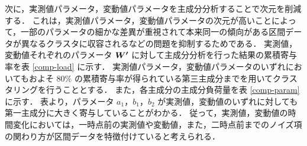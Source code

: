 \documentclass[technicalreport]{ieicej}
\begin{document}
次に，実測値パラメータ，変動値パラメータを主成分分析\cite{jolliffe2016principal}することで次元を削減する．
これは，実測値パラメータ，変動値パラメータの次元が高いことによって，一部のパラメータの細かな差異が重視されて本来同一の傾向がある区間データが異なるクラスタに収容されるなどの問題を抑制するためである．
実測値，変動値それぞれのパラメータ $\mbox{\boldmath $W^\prime$}$ に対して主成分分析を行った結果の累積寄与率を表 \ref{comp-load} に示す．
実測値パラメータ，変動値パラメータのいずれにおいてもおよそ $80\%$ の累積寄与率が得られている第三主成分までを用いてクラスタリングを行うこととする．
また，各主成分の主成分負荷量を表 \ref{comp-param} に示す．
表より，パラメータ $a_1，b_1，b_2$ が実測値，変動値のいずれに対しても第一主成分に大きく寄与していることがわかる．
従って，実測値，変動値の時間変化においては，一時点前の実測値や変動値，また，二時点前までのノイズ項の関わり方が区間データを特徴付けていると考えられる．

\begin{table}[tb]
\begin{center}
\caption{累積寄与率}
\label{comp-load}
\\
\end{center}
\end{table}
\end{document}
